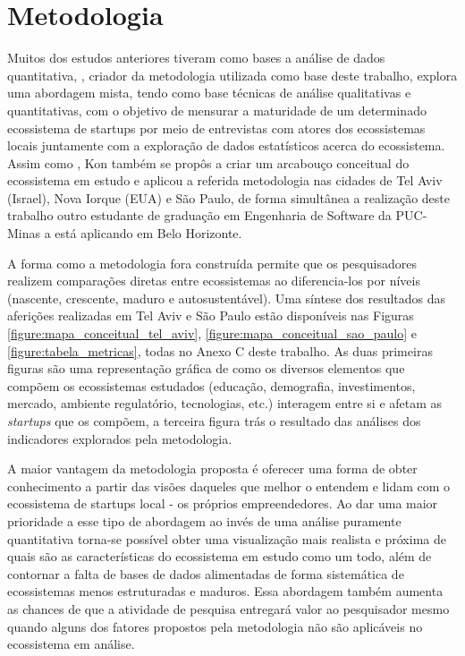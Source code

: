 \chapter{Metodologia}
\label{cap-metodologia}

Muitos dos estudos anteriores tiveram como bases a análise de dados quantitativa, , criador da metodologia utilizada como base deste trabalho, explora uma abordagem mista, tendo como base técnicas de análise qualitativas e quantitativas, com o objetivo de mensurar a maturidade de um determinado ecossistema de startups por meio de entrevistas com atores dos ecossistemas locais juntamente com a exploração de dados estatísticos acerca do ecossistema. Assim como , Kon também se propôs a criar um arcabouço conceitual do ecossistema em estudo e aplicou a referida metodologia nas cidades de Tel Aviv (Israel), Nova Iorque (EUA) e São Paulo, de forma simultânea a realização deste trabalho outro estudante de graduação em Engenharia de Software da PUC-Minas a está aplicando em Belo Horizonte. 

A forma como a metodologia fora construída permite que os pesquisadores realizem comparações diretas entre ecossistemas ao diferencia-los por níveis (nascente, crescente, maduro e autosustentável). Uma síntese dos resultados das aferições realizadas em Tel Aviv e São Paulo estão disponíveis nas Figuras \ref{figure:mapa_conceitual_tel_aviv}, \ref{figure:mapa_conceitual_sao_paulo} e \ref{figure:tabela_metricas}, todas no Anexo C deste trabalho. As duas primeiras figuras são uma representação gráfica de como os diversos elementos que compõem os ecossistemas estudados (educação, demografia, investimentos, mercado, ambiente regulatório, tecnologias, etc.) interagem entre si e afetam as \textit{startups} que os compõem, a terceira figura trás o resultado das análises dos indicadores explorados pela metodologia.

A maior vantagem da metodologia proposta é oferecer uma forma de obter conhecimento a partir das visões daqueles que melhor o entendem e lidam com o ecossistema de startups local - os próprios empreendedores. Ao dar uma maior prioridade a esse tipo de abordagem ao invés de uma análise puramente quantitativa torna-se possível obter uma visualização mais realista e próxima de quais são as características do ecossistema em estudo como um todo, além de contornar a falta de bases de dados alimentadas de forma sistemática de ecossistemas menos estruturadas e maduros. Essa abordagem também aumenta as chances de que a atividade de pesquisa entregará valor ao pesquisador mesmo quando alguns dos fatores propostos pela metodologia não são aplicáveis no ecossistema em análise.

